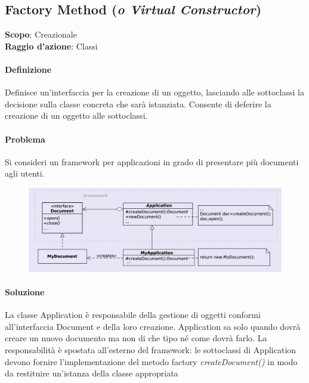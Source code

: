 \subsection{Factory Method (\textit{o Virtual Constructor})}
\label{factory-method}

\textbf{Scopo}: Creazionale  \\
\textbf{Raggio d'azione}: Classi

\paragraph{Definizione} Definisce un'interfaccia per la creazione di un oggetto, lasciando alle sottoclassi la decisione sulla classe concreta che sarà istanziata. Consente di deferire la creazione di un oggetto alle sottoclassi.

\paragraph{Problema} Si consideri un framework per applicazioni in grado di presentare più documenti agli utenti.

\begin{figure}[H]
    \centering
    \includegraphics[width=1\linewidth]{assets/pattern/factory-method/factory-method-esempio.png}
\end{figure}

\paragraph{Soluzione} La classe Application è responsabile della gestione di oggetti conformi all’interfaccia Document e della loro creazione. Application sa solo quando dovrà creare un nuovo documento ma non di che tipo né come dovrà farlo. La responsabilità è spostata all’esterno del framework: le sottoclassi di Application devono fornire l’implementazione del metodo factory \textit{createDocument()} in modo da restituire un’istanza della classe appropriata

